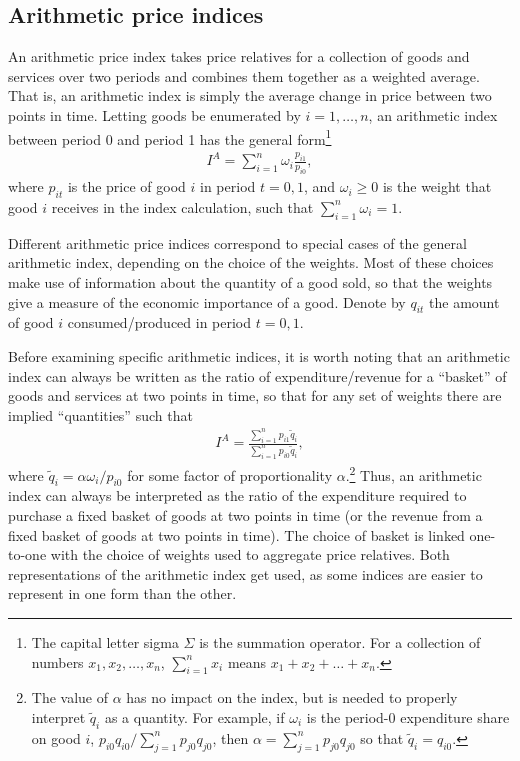 \documentclass[
]{article}
\begin{document}
\hypertarget{arithmetic-price-indices}{%
\subsection{Arithmetic price indices}\label{arithmetic-price-indices}}

An arithmetic price index takes price relatives for a collection of goods and services over two periods and combines them together as a weighted average. That is, an arithmetic index is simply the average change in price between two points in time. Letting goods be enumerated by \(i = 1,\ldots, n\), an arithmetic index between period 0 and period 1 has the general form\footnote{The capital letter sigma \(\Sigma\) is the summation operator. For a collection of numbers \(x_{1}, x_{2},\ldots,x_{n}\), \(\sum_{i=1}^{n} x_{i}\) means \(x_{1} + x_{2} + \ldots + x_{n}\).}
\begin{align*}
I^{A} = \sum_{i = 1}^{n} \omega_{i} \frac{p_{i1}}{p_{i0}},
\end{align*}
where \(p_{it}\) is the price of good \(i\) in period \(t = 0,1\), and \(\omega_{i} \geq 0\) is the weight that good \(i\) receives in the index calculation, such that \(\sum_{i = 1}^{n} \omega_{i} = 1\).

Different arithmetic price indices correspond to special cases of the general arithmetic index, depending on the choice of the weights. Most of these choices make use of information about the quantity of a good sold, so that the weights give a measure of the economic importance of a good. Denote by \(q_{it}\) the amount of good \(i\) consumed/produced in period \(t = 0,1\).

Before examining specific arithmetic indices, it is worth noting that an arithmetic index can always be written as the ratio of expenditure/revenue for a ``basket'' of goods and services at two points in time, so that for any set of weights there are implied ``quantities'' such that
\begin{align*}
I^{A} = \frac{\sum_{i = 1}^{n} p_{i1} \tilde{q}_{i}}{\sum_{i = 1}^{n} p_{i0} \tilde{q}_{i}},
\end{align*}
where \(\tilde{q}_{i} = \alpha \omega_{i} / p_{i0}\) for some factor of proportionality \(\alpha\).\footnote{The value of \(\alpha\) has no impact on the index, but is needed to properly interpret \(\tilde{q}_{i}\) as a quantity. For example, if \(\omega_{i}\) is the period-0 expenditure share on good \(i\), \(p_{i0} q_{i0} / \sum_{j = 1}^{n} p_{j0} q_{j0}\), then \(\alpha = \sum_{j = 1}^{n} p_{j0} q_{j0}\) so that \(\tilde{q}_{i} = q_{i0}\).} Thus, an arithmetic index can always be interpreted as the ratio of the expenditure required to purchase a fixed basket of goods at two points in time (or the revenue from a fixed basket of goods at two points in time). The choice of basket is linked one-to-one with the choice of weights used to aggregate price relatives. Both representations of the arithmetic index get used, as some indices are easier to represent in one form than the other.
\end{document}
